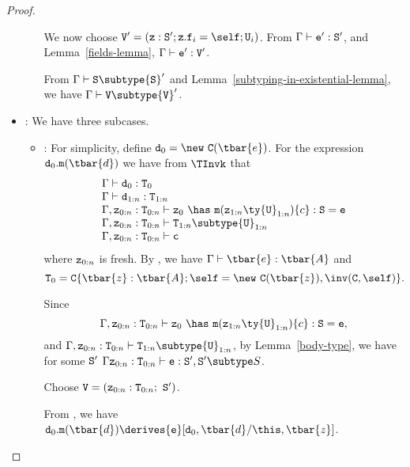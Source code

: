 \begin{proof}
\begin{itemize}
\begin{itemize}
{             We now choose 
             ${\tt V'} = ({\tt z}: {\tt S}'; {\tt z}.{\tt f}_i=\self;{\tt U}_i)$.
             From $\Gamma \vdash {\tt e}': {\tt S}'$, and
             Lemma~\ref{fields-lemma},
             $\Gamma \vdash {\tt e}' : {\tt V}'$.

             From $\Gamma \vdash {\tt S} \subtype {\tt S}'$ and 
             Lemma~\ref{subtyping-in-existential-lemma}, we have $\Gamma \vdash {\tt V} \subtype {\tt V}'$.
             }
   \end{itemize}
\item
\TInvk: We have three subcases.
   \begin{itemize}
   \item
   \RInvk:  
            For simplicity, define ${\tt d}_0 = \new\ {\tt C}(\tbar{e})$.
            For the expression 
            ${\tt d}_0.{\tt m}(\tbar{d})$
            we have from $\TInvk$ that
            $$
            \begin{array}{l}
            \Gamma \vdash {\tt d}_0: {\tt T}_0 \\
            \Gamma \vdash {\tt d}_{1:n}: {\tt T}_{1:n} \\
            \Gamma, {\tt z}_{0:n}: {\tt T}_{0:n} \vdash {\tt z}_0\ \has\ {\tt m}({\tt z}_{1:n} \ty {\tt U}_{1:n})\{c\}: {\tt S} = {\tt e} \\
            \Gamma, {\tt z}_{0:n}: {\tt T}_{0:n} \vdash {\tt T}_{1:n} \subtype {\tt U}_{1:n} \\
            \Gamma, {\tt z}_{0:n}: {\tt T}_{0:n} \vdash {\tt c} \\
            \end{array}
            $$
            \noindent
            where ${\tt z}_{0:n}$ is fresh.  By \TNew, we have
            $\Gamma \vdash \tbar{e}: \tbar{A}$
            and
            $${\tt T}_0 = {\tt C}\{\tbar{z}: \tbar{A}; \self = \new\ {\tt C}(\tbar{z}), \inv({\tt C},\self)\}.$$

            Since
            $$\Gamma, {\tt z}_{0:n}: {\tt T}_{0:n} \vdash {\tt z}_0\ \has\ {\tt m}({\tt z}_{1:n} \ty {\tt U}_{1:n})\{c\}: {\tt S} = {\tt e},$$
            and 
            $\Gamma, {\tt z}_{0:n}: {\tt T}_{0:n} \vdash {\tt T}_{1:n} \subtype {\tt U}_{1:n}$,
            by Lemma~\ref{body-type}, we have for some ${\tt S}'$
            $\Gamma {\tt z}_{0:n}: {\tt T}_{0:n} \vdash {\tt e}: {\tt S}',{\tt S}' \subtype S$.

            Choose ${\tt V} = ({\tt z}_{0:n}: {\tt T}_{0:n};\ {\tt S}')$.

            From \RInvk, we have
            ${\tt d}_0.{\tt m}(\tbar{d}) \derives {\tt e}[{\tt d}_0,\tbar{d}/\this,\tbar{z}]$.


\end{itemize}
\end{itemize}
\end{proof}
